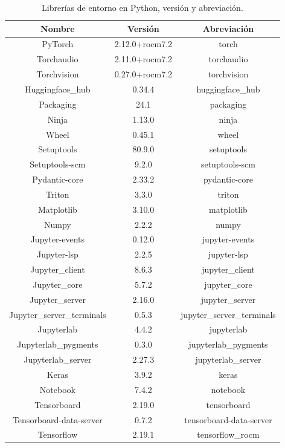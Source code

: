 \documentclass[11pt,a4paper,spanish]{book}
\numberwithin{equation}{chapter}
\numberwithin{figure}{chapter}
\begin{document}
\begin{table}[h]
\centering
\begin{tabular}{|c|c|c|}
	\hline
	Nombre & Versión & Abreviación \\
	\hline
	PyTorch & 2.12.0+rocm7.2 & torch \\
	Torchaudio & 2.11.0+rocm7.2 & torchaudio \\
	Torchvision & 0.27.0+rocm7.2 & torchvision \\
	Huggingface\_hub & 0.34.4 & huggingface\_hub \\
	Packaging & 24.1 & packaging \\
	Ninja & 1.13.0 & ninja \\
	Wheel & 0.45.1 & wheel \\
	Setuptools & 80.9.0 & setuptools \\
	Setuptools-scm & 9.2.0 & setuptools-scm \\
	Pydantic-core & 2.33.2 & pydantic-core \\
	Triton & 3.3.0 & triton \\
	Matplotlib & 3.10.0 & matplotlib \\
	Numpy & 2.2.2 & numpy \\
	Jupyter-events & 0.12.0 & jupyter-events \\
	Jupyter-lsp & 2.2.5 & jupyter-lsp \\
	Jupyter\_client & 8.6.3 & jupyter\_client \\
	Jupyter\_core & 5.7.2 & jupyter\_core \\
	Jupyter\_server & 2.16.0 & jupyter\_server \\
	Jupyter\_server\_terminals & 0.5.3 & jupyter\_server\_terminals \\
	Jupyterlab & 4.4.2 & jupyterlab \\
	Jupyterlab\_pygments & 0.3.0 & jupyterlab\_pygments \\
	Jupyterlab\_server & 2.27.3 & jupyterlab\_server \\
	Keras & 3.9.2 & keras \\
	Notebook & 7.4.2 & notebook \\
	Tensorboard & 2.19.0 & tensorboard \\
	Tensorboard-data-server & 0.7.2 & tensorboard-data-server \\
	Tensorflow & 2.19.1 & tensorflow\_rocm \\
	\hline
\end{tabular}
\caption{Librerías de entorno en Python, versión y abreviación.}
\label{tab:python-libs}
\end{table}
\end{document}
